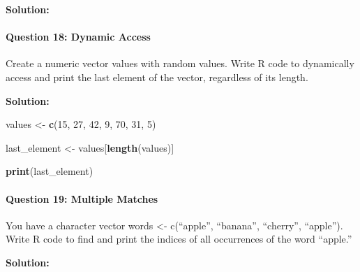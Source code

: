 \documentclass[
]{article}
\newenvironment{Shaded}{\begin{snugshade}}{\end{snugshade}}
\newcommand{\DecValTok}[1]{\textcolor[rgb]{0.00,0.00,0.81}{#1}}
\newcommand{\FunctionTok}[1]{\textcolor[rgb]{0.13,0.29,0.53}{\textbf{#1}}}
\newcommand{\NormalTok}[1]{#1}
\newcommand{\OtherTok}[1]{\textcolor[rgb]{0.56,0.35,0.01}{#1}}
\newcommand{\SpecialCharTok}[1]{\textcolor[rgb]{0.81,0.36,0.00}{\textbf{#1}}}
\begin{document}
\textbf{Solution:}

\begin{Shaded}
\end{Shaded}

\hypertarget{question-18-dynamic-access}{%
\paragraph{Question 18: Dynamic
Access}\label{question-18-dynamic-access}}

Create a numeric vector values with random values. Write R code to
dynamically access and print the last element of the vector, regardless
of its length.

\textbf{Solution:}

\begin{Shaded}
\begin{Highlighting}[]
\NormalTok{values }\OtherTok{\textless{}{-}} \FunctionTok{c}\NormalTok{(}\DecValTok{15}\NormalTok{, }\DecValTok{27}\NormalTok{, }\DecValTok{42}\NormalTok{, }\DecValTok{9}\NormalTok{, }\DecValTok{70}\NormalTok{, }\DecValTok{31}\NormalTok{, }\DecValTok{5}\NormalTok{)}

\NormalTok{last\_element }\OtherTok{\textless{}{-}}\NormalTok{ values[}\FunctionTok{length}\NormalTok{(values)]}

\FunctionTok{print}\NormalTok{(last\_element)}
\end{Highlighting}
\end{Shaded}

\hypertarget{question-19-multiple-matches}{%
\paragraph{Question 19: Multiple
Matches}\label{question-19-multiple-matches}}

You have a character vector words \textless- c(``apple'', ``banana'',
``cherry'', ``apple''). Write R code to find and print the indices of
all occurrences of the word ``apple.''

\textbf{Solution:}
\end{document}
